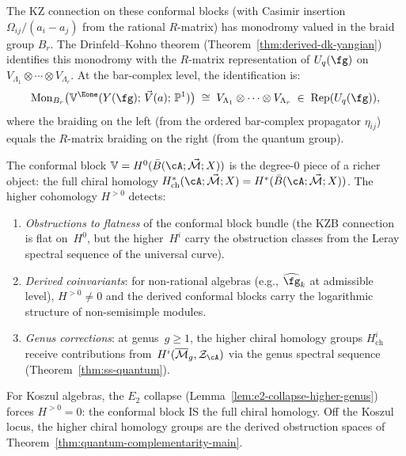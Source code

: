 The KZ connection on these conformal blocks (with Casimir insertion
$\Omega_{ij}/(a_i - a_j)$ from the rational $R$-matrix) has
monodromy valued in the braid group $B_r$.  The
Drinfeld--Kohno theorem
(Theorem~\ref{thm:derived-dk-yangian}) identifies this monodromy
with the $R$-matrix representation of $U_q(\fg)$ on
$V_{\Lambda_1} \otimes \cdots \otimes V_{\Lambda_r}$.  At the
bar-complex level, the identification is:
\begin{equation}\label{eq:dk-conformal-blocks}
\mathrm{Mon}_{B_r}\bigl(
\mathbb{V}^{\Eone}(Y(\fg);\, \vec{V}(a);\, \mathbb{P}^1)\bigr)
\;\cong\;
V_{\Lambda_1} \otimes \cdots \otimes V_{\Lambda_r}
\;\in\; \operatorname{Rep}(U_q(\fg)),
\end{equation}
where the braiding on the left (from the ordered bar-complex
propagator $\eta_{ij}$) equals the $R$-matrix braiding on the
right (from the quantum group).

\begin{remark}
\label{rem:chiral-homology-derived-conformal}
The conformal block $\mathbb{V} = H^0(\bar{B}(\cA;\vec{\mathcal{M}};X))$
is the degree-$0$ piece of a richer object: the full chiral
homology
$H^*_{\mathrm{ch}}(\cA; \vec{\mathcal{M}}; X)
= H^*(\bar{B}(\cA; \vec{\mathcal{M}}; X))$.
The higher cohomology $H^{>0}$ detects:
\begin{enumerate}
\item \emph{Obstructions to flatness} of the conformal block
  bundle (the KZB connection is flat on~$H^0$, but the
  higher~$H^i$ carry the obstruction classes from the Leray
  spectral sequence of the universal curve).
\item \emph{Derived coinvariants}: for non-rational algebras
  (e.g., $\widehat{\fg}_k$ at admissible level), $H^{>0} \neq 0$
  and the derived conformal blocks carry the logarithmic
  structure of non-semisimple modules.
\item \emph{Genus corrections}: at genus~$g \ge 1$, the higher
  chiral homology groups $H^i_{\mathrm{ch}}$ receive contributions
  from~$H^i(\overline{\mathcal{M}}_g, \mathcal{Z}_\cA)$ via
  the genus spectral sequence
  (Theorem~\ref{thm:ss-quantum}).
\end{enumerate}
For Koszul algebras, the $E_2$ collapse
(Lemma~\ref{lem:e2-collapse-higher-genus}) forces
$H^{>0} = 0$: the conformal block IS the full chiral homology.
Off the Koszul locus, the higher chiral homology groups are
the derived obstruction spaces of
Theorem~\ref{thm:quantum-complementarity-main}.
\end{remark}

